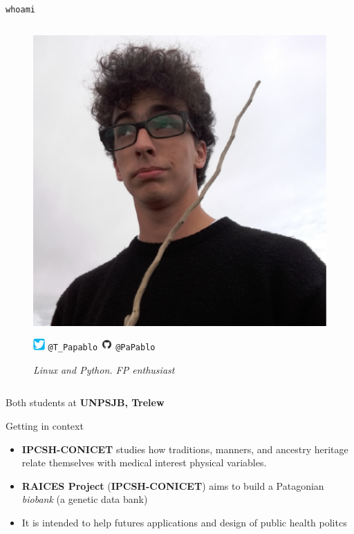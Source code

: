 \documentclass{beamer}
\begin{document}
\begin{frame}[fragile]{\texttt{whoami}}
\begin{columns}
            \begin{figure}[H]
                \centering
                \includegraphics[width=0.8\linewidth]{profile-pablo.png}
                \caption{\emph{Linux and Python. FP enthusiast}}
                \includegraphics[height=1.2em]{logo-twitter.png} \texttt{@T\_Papablo} 
                \linebreak
                \includegraphics[height=1.2em]{logo-github.png} \texttt{@PaPablo} 
            \end{figure}
    \end{columns}

    \vspace*{5mm}
    Both students at \textbf{UNPSJB, Trelew}
\end{frame}

\begin{frame}[fragile]{Getting in context}
    \begin{itemize}
        \item \textbf{IPCSH-CONICET} studies how traditions, manners, and ancestry heritage relate themselves with medical interest physical variables.
        \item \textbf{RAICES Project} (\textbf{IPCSH-CONICET}) aims to build a Patagonian \emph{biobank} (a genetic data bank) 
        \item It is intended to help futures applications and design of public health politcs
    \end{itemize}
\end{frame}
\end{document}
